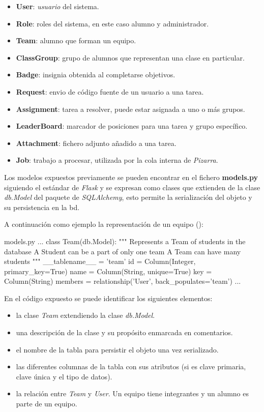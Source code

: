 \documentclass[11pt,spanish,listoffigures,listoftables]{tfgetsinf}
\begin{document}
\begin{itemize}
	\item \textbf{User}: \textit{usuario} del sistema.
	\item \textbf{Role}: roles del sistema, en este caso \gls{alumno} y \gls{administrador}.
	\item \textbf{Team}: \gls{alumno} que forman un \gls{equipo}.
	\item \textbf{ClassGroup}: \gls{grupo} de \gls{alumno}s que representan una clase en particular.
	\item \textbf{Badge}: \Gls{insignia} obtenida al completarse objetivos.
	\item \textbf{Request}: \gls{envio} de código fuente de un usuario a una \Gls{tarea}.
	\item \textbf{Assignment}: \Gls{tarea} a resolver, puede estar asignada a uno o más grupos.
	\item \textbf{LeaderBoard}: marcador de posiciones para una \Gls{tarea} y \Gls{grupo} específico.
	\item \textbf{Attachment}: fichero adjunto añadido a una \Gls{tarea}.
	\item \textbf{Job}: trabajo a procesar, utilizada por la \Gls{cola} interna de \textit{Pizarra}.
\end{itemize}

Los modelos expuestos previamente se pueden encontrar en el fichero \textbf{models.py} siguiendo el estándar de \textit{Flask} y se expresan como clases que extienden de la clase \textit{db.Model} del paquete de \textit{SQLAlchemy}, esto permite la serialización del objeto y su persistencia en la \Gls{bd}. 

A continuación como ejemplo la representación de un \gls{equipo} ():

\begin{code}{models.py}
	...
	class Team(db.Model):
	"""
	Represents a Team of students in the database
	A Student can be a part of only one team
	A Team can have many students
	"""
	__tablename__ = 'team'
	id = Column(Integer, primary_key=True)
	name = Column(String, unique=True)
	key = Column(String)
	members = relationship('User', back_populates='team')
	...
\end{code}

En el código expuesto se puede identificar los siguientes elementos:

\begin{itemize}
	\item la clase \textit{Team} extendiendo la clase \textit{db.Model}.
	\item una descripción de la clase y su propósito enmarcada en comentarios.
	\item el nombre de la tabla para persistir el objeto una vez serializado.
	\item las diferentes columnas de la tabla con sus atributos (si es clave primaria, clave única y el tipo de datos).
	\item la relación entre \textit{Team} y \textit{User}. Un \gls{equipo} tiene integrantes y un \gls{alumno} es parte de un \gls{equipo}.
\end{itemize}
\end{document}

